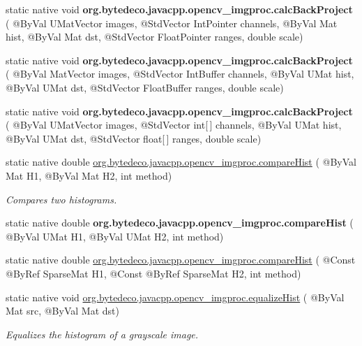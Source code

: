 \begin{DoxyCompactItemize}
static native void {\bfseries org.\+bytedeco.\+javacpp.\+opencv\+\_\+imgproc.\+calc\+Back\+Project} ( @By\+Val U\+Mat\+Vector images, @Std\+Vector Int\+Pointer channels, @By\+Val Mat hist, @By\+Val Mat dst, @Std\+Vector Float\+Pointer ranges, double scale)
\item 
\mbox{\label{group__imgproc__hist_ga2b4952d579f64a3387ffbb780f5ada5e}} 
static native void {\bfseries org.\+bytedeco.\+javacpp.\+opencv\+\_\+imgproc.\+calc\+Back\+Project} ( @By\+Val Mat\+Vector images, @Std\+Vector Int\+Buffer channels, @By\+Val U\+Mat hist, @By\+Val U\+Mat dst, @Std\+Vector Float\+Buffer ranges, double scale)
\item 
\mbox{\label{group__imgproc__hist_ga91aa6cfe98f7c530b7d6fc15b516beae}} 
static native void {\bfseries org.\+bytedeco.\+javacpp.\+opencv\+\_\+imgproc.\+calc\+Back\+Project} ( @By\+Val U\+Mat\+Vector images, @Std\+Vector int\mbox{[}$\,$\mbox{]} channels, @By\+Val U\+Mat hist, @By\+Val U\+Mat dst, @Std\+Vector float\mbox{[}$\,$\mbox{]} ranges, double scale)
\item 
static native double \hyperlink{group__imgproc__hist_ga2c5a33af2393e75272a7346241822627}{org.\+bytedeco.\+javacpp.\+opencv\+\_\+imgproc.\+compare\+Hist} ( @By\+Val Mat H1, @By\+Val Mat H2, int method)
\begin{DoxyCompactList}\small\item\em Compares two histograms. \end{DoxyCompactList}\item 
\mbox{\label{group__imgproc__hist_ga17c131d1733126972fe3ac37bc2d1155}} 
static native double {\bfseries org.\+bytedeco.\+javacpp.\+opencv\+\_\+imgproc.\+compare\+Hist} ( @By\+Val U\+Mat H1, @By\+Val U\+Mat H2, int method)
\item 
static native double \hyperlink{group__imgproc__hist_gadc2285df53903ac40eb1f3ac72136eb1}{org.\+bytedeco.\+javacpp.\+opencv\+\_\+imgproc.\+compare\+Hist} ( @Const @By\+Ref Sparse\+Mat H1, @Const @By\+Ref Sparse\+Mat H2, int method)
\item 
static native void \hyperlink{group__imgproc__hist_gabfd0825b3947af498b1eecc64de2787c}{org.\+bytedeco.\+javacpp.\+opencv\+\_\+imgproc.\+equalize\+Hist} ( @By\+Val Mat src, @By\+Val Mat dst)
\begin{DoxyCompactList}\small\item\em Equalizes the histogram of a grayscale image. \end{DoxyCompactList}\item 

\end{DoxyCompactItemize}
